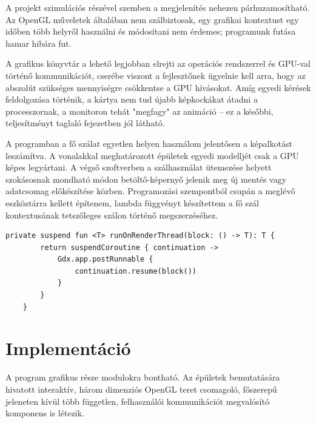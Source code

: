 A projekt szimulációs részével szemben a megjelenítés nehezen párhuzamosítható. Az OpenGL műveletek általában nem szálbiztosak, egy grafikai kontextust egy időben több helyről használni és módosítani nem érdemes; programunk futása hamar hibára fut.

A grafikus könyvtár a lehető legjobban elrejti az operációs rendszerrel és GPU-val történő kommunikációt, cserébe viszont a fejlesztőnek ügyelnie kell arra, hogy az abszolút szükséges mennyiségre csökkentse a GPU hívásokat. Amíg egyedi kérések feldolgozása történik, a kártya nem tud újabb képkockákat átadni a processzornak, a monitoron tehát "megfagy" az animáció -- ez a későbbi, teljesítményt taglaló fejezetben jól látható.

A programban a fő szálat egyetlen helyen használom jelentősen a képalkotást leszámítva. A vonalakkal meghatározott épületek egyedi modelljét csak a GPU képes legyártani. A végső szoftverben a szálhasználat ütemezése helyett szokásosnak mondható módon betöltő-képernyő jelenik meg új mentés vagy adatcsomag előkészítése közben. Programozási szempontból csupán a meglévő eszköztárra kellett építenem, lambda függvényt készítettem a fő szál kontextusának tetszőleges szálon történő megszerzéséhez.

\begin{lstlisting}[caption=A kirajzoló szál használatát segítő generikus függvény]
private suspend fun <T> runOnRenderThread(block: () -> T): T {
        return suspendCoroutine { continuation ->
            Gdx.app.postRunnable {
                continuation.resume(block())
            }
        }
    }
\end{lstlisting}

\section{Implementáció}
A program grafikus része modulokra bontható. Az épületek bemutatására hivatott interaktív, három dimenziós OpenGL teret csomagoló, főszerepű jeleneten kívül több független, felhasználói kommunikációt megvalósító komponens is létezik.

